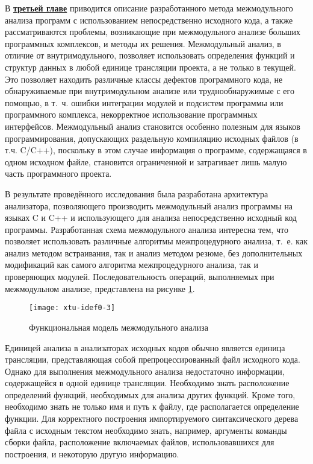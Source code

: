 В \underline{\textbf{третьей главе}} приводится описание разработанного метода межмодульного анализа программ с использованием непосредственно исходного кода, а также рассматриваются проблемы, возникающие при межмодульного анализе больших программных комплексов, и методы их решения. Межмодульный анализ, в отличие от внутримодульного, позволяет использовать определения функций и структур данных в любой единице трансляции проекта, а не только в текущей. Это позволяет находить различные классы дефектов программного кода, не обнаруживаемые при внутримодульном анализе или труднообнаружимые с его помощью, в т.~ч. ошибки интеграции модулей и подсистем программы или программного комплекса, некорректное использование программных интерфейсов. Межмодульный анализ становится особенно полезным для языков программирования, допускающих раздельную компиляцию исходных файлов (в т.ч. C/C++), поскольку в этом случае информация о программе, содержащаяся в одном исходном файле, становится ограниченной и затрагивает лишь малую часть программного проекта.

В результате проведённого исследования была разработана архитектура анализатора, позволяющего производить межмодульный анализ программы на языках C и C++ и использующего для анализа непосредственно исходный код программы. Разработанная схема межмодульного анализа интересна тем, что позволяет использовать различные алгоритмы межпроцедурного анализа, т.~е. как анализ методом встраивания, так и анализ методом резюме, без дополнительных модификаций как самого алгоритма межпроцедурного анализа, так и проверяющих модулей. Последовательность операций, выполняемых при межмодульном анализе, представлена на рисунке \ref{xtu-idef0}.

\begin{figure}[h]
 \label{}
 \centering
 \texttt{[image: xtu-idef0-3]}
 \caption{Функциональная модель межмодульного анализа}\label{xtu-idef0}
\end{figure}


Единицей анализа в анализаторах исходных кодов обычно является единица трансляции, представляющая собой препроцессированный файл исходного кода. Однако для выполнения межмодульного анализа недостаточно информации, содержащейся в одной единице трансляции. Необходимо знать расположение определений функций, необходимых для анализа других функций. Кроме того, необходимо знать не только имя и путь к файлу, где располагается определение функции. Для корректного построения импортируемого синтаксического дерева файла с исходным текстом необходимо знать, например, аргументы команды сборки файла, расположение включаемых файлов, использовавшихся для построения, и некоторую другую информацию.

